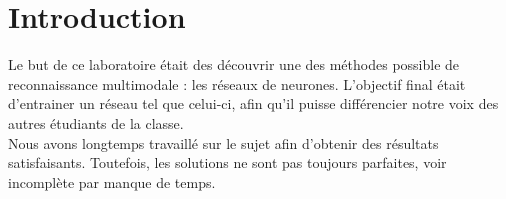 
\chapter{Introduction} %

\label{Chapitre 1} %


Le but de ce laboratoire était des découvrir une des méthodes possible de reconnaissance multimodale : les réseaux de neurones. L'objectif final était d'entrainer un réseau tel que celui-ci, afin qu'il puisse différencier notre voix des autres étudiants de la classe.\\

Nous avons longtemps travaillé sur le sujet afin d'obtenir des résultats satisfaisants. Toutefois, les solutions ne sont pas toujours parfaites, voir incomplète par manque de temps.
























